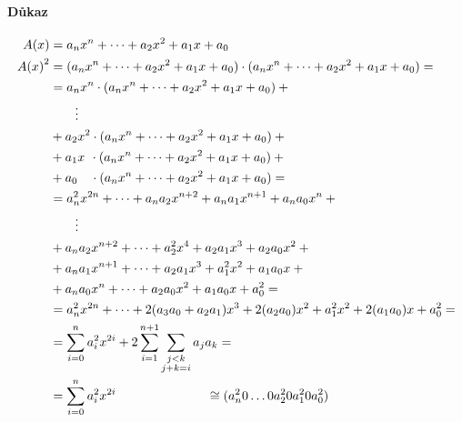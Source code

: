 \documentclass[thesis=M,czech,hidelinks]{FITthesis}[2012/06/26]
\newcommand{\0}{{\textcolor[gray]{0.80}{0}}}
\begin{document}
\paragraph{Důkaz}
\begin{align*}
    A(x)     &=  a_n x^n + \dots + a_2 x^2 + a_1 x + a_0 \\
    {A(x)}^2 &=  (a_n x^n + \dots + a_2 x^2 + a_1 x + a_0)\cdot(a_n x^n + \dots + a_2 x^2 + a_1 x + a_0) =  \\
             &= a_n x^n   \cdot (a_n x^n + \dots + a_2 x^2 + a_1 x + a_0) + {}                              \\
             & \qquad \vdots                                                                                \\
             &  {} + a_2 x^2   \cdot (a_n x^n + \dots + a_2 x^2 + a_1 x + a_0) + {}                         \\
             &  {} + a_1 x \, \:  \cdot (a_n x^n + \dots + a_2 x^2 + a_1 x + a_0) + {}                      \\
             &  {} + a_0 \quad \cdot (a_n x^n + \dots + a_2 x^2 + a_1 x + a_0) =                            \\
             &= a_n^2 x^{2n}    + \dots + a_n a_2 x^{n+2} + a_n a_1 x^{n+1} + a_n a_0 x^n + {}              \\
             & \qquad \vdots                                                                                \\
             &  {} + a_n a_2 x^{n+2} + \dots + a_2^2 x^4       + a_2 a_1 x^3     + a_2 a_0 x^2 + {}         \\
             &  {} + a_n a_1 x^{n+1} + \dots + a_2 a_1 x^3     + a_1^2 x^2       + a_1 a_0 x   + {}         \\
             &  {} + a_n a_0 x^n     + \dots + a_2 a_0 x^2     + a_1 a_0 x       + a_0^2       =            \\
             &= a_n^2 x^{2n} + \dots  + 2 ( a_3 a_0 + a_2 a_1 ) x^3  + 2 ( a_2 a_0 ) x^2 + a_1^2 x^2 + 2 ( a_1 a_0 ) x + a_0^2 = \\
             &= \sum_{i=0}^{n} a_i^2 x^{2i} + 2 \sum_{i=1}^{n+1}\sum_{\substack{j<k \\ j+k = i}} a_j a_k =  \\
             &= \sum_{i=0}^{n} a_i^2 x^{2i}
    \hspace{2.5cm} \cong (a_n^2 0 \dots 0 a_2^2 0 a_1^2 0 a_0^2)
\end{align*}
\end{document}

